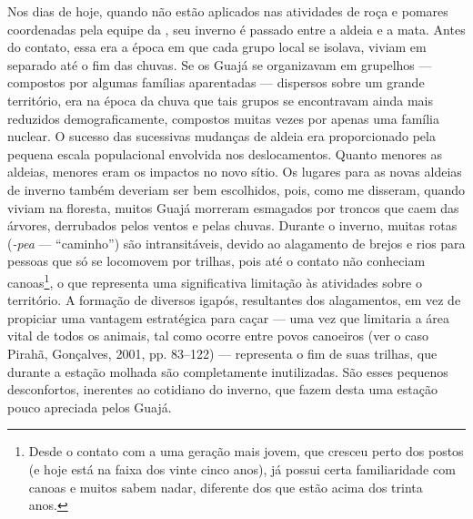 Nos dias de hoje, quando não estão aplicados nas atividades de roça e
pomares coordenadas pela equipe da , seu inverno é passado entre a
aldeia e a mata. Antes do contato, essa era a época em que cada grupo
local se isolava, viviam em separado até o fim das chuvas. Se os Guajá
se organizavam em grupelhos --- compostos por algumas famílias aparentadas
--- dispersos sobre um grande território, era na época da chuva que tais
grupos se encontravam ainda mais reduzidos demograficamente, compostos
muitas vezes por apenas uma família nuclear. O sucesso das sucessivas
mudanças de aldeia era proporcionado pela pequena escala populacional
envolvida nos deslocamentos. Quanto menores as aldeias, menores eram os
impactos no novo sítio. Os lugares para as novas aldeias de inverno
também deveriam ser bem escolhidos, pois, como me disseram, quando
viviam na floresta, muitos Guajá morreram esmagados por troncos que caem
das árvores, derrubados pelos ventos e pelas chuvas. Durante o inverno,
muitas rotas (\emph{-pea} --- ``caminho'') são intransitáveis, devido ao
alagamento de brejos e rios para pessoas que só se locomovem por
trilhas, pois até o contato não conheciam canoas\footnote{Desde o
  contato com a  uma geração mais jovem, que cresceu perto dos
  postos (e hoje está na faixa dos vinte cinco anos), já possui certa
  familiaridade com canoas e muitos sabem nadar, diferente dos que estão
  acima dos trinta anos.}, o que representa uma significativa limitação
às atividades sobre o território. A formação de diversos igapós,
resultantes dos alagamentos, em vez de propiciar uma vantagem
estratégica para caçar --- uma vez que limitaria a área vital de todos os
animais, tal como ocorre entre povos canoeiros (ver o caso Pirahã,
Gonçalves, 2001, pp. 83--122) --- representa o fim de suas trilhas, que
durante a estação molhada são completamente inutilizadas. São esses
pequenos desconfortos, inerentes ao cotidiano do inverno, que fazem
desta uma estação pouco apreciada pelos Guajá.

